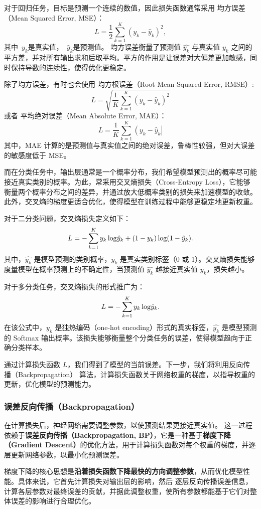 对于回归任务，目标是预测一个连续的数值，因此损失函数通常采用 均方误差（Mean Squared Error, MSE）：
$$ L = \frac{1}{2} \sum_{k=1}^K \left( y_k-\hat y_k \right)^2, $$
其中~$y_k$是真实值，~$\hat y_k$是预测值。 均方误差衡量了预测值 $\hat{y_k}$ 与真实值 $y_k$ 之间的平方差，并对所有输出求和后取平均。平方的作用是让误差对大偏差更加敏感，同时保持导数的连续性，使得优化更稳定。

除了均方误差，有时也会使用 均方根误差（Root Mean Squared Error, RMSE）:
$$
L= \sqrt{\frac{1}{K} \sum_{k=1}^K \left( y_k-\hat y_k \right)^2}
$$
或者 平均绝对误差（Mean Absolute Error, MAE）：
$$
L=\frac{1}{K}  \sum_{k=1}^K \left( y_k-\hat y_k \right|
$$
其中，MAE 计算的是预测值与真实值之间的绝对误差，鲁棒性较强，但对大误差的敏感度低于 MSE。

而在分类任务中，输出层通常是一个概率分布，我们希望模型预测出的概率尽可能接近真实类别的概率。为此，常采用交叉熵损失（Cross-Entropy Loss），它能够衡量两个概率分布之间的差异，并通过放大低概率类别的损失来加速模型的收敛。此外，交叉熵的梯度更适合优化，使得模型在训练过程中能够更稳定地更新权重。

对于二分类问题，交叉熵损失定义如下：
$$
L= -\sum_{k=1}^K y_k\, {\rm log } \hat y_k + (1-y_k) \, {\rm log } (1-\hat y_k).
$$
其中，$\hat{y_k}$ 是模型预测的类别概率，$y_k$ 是真实类别标签（0 或 1）。交叉熵损失能够度量模型在概率预测上的不确定性，当预测值 $\hat{y_k}$ 越接近真实值 $y_k$，损失越小。

对于多分类任务，交叉熵损失的形式推广为：
$$
L= -\sum_{k=1}^K y_k\, {\rm log } \hat y_k.
$$
在该公式中，$y_k$ 是独热编码（one-hot encoding）形式的真实标签，$\hat{y_k}$ 是模型预测的 Softmax 输出概率。该损失能够衡量整个分类任务的误差，使得模型趋向于正确分类样本。

通过计算损失函数 $L$，我们得到了模型的当前误差。下一步，我们将利用反向传播（Backpropagation） 算法，计算损失函数关于网络权重的梯度，以指导权重的更新，优化模型的预测能力。

\subsubsection*{ 误差反向传播（Backpropagation）} 
在计算损失后，神经网络需要调整参数，以使预测结果更接近真实值。
这一过程依赖于{\bf 误差反向传播（Backpropagation, BP）}，它是一种基于{\bf 梯度下降（Gradient Descent）}的优化方法，用于计算损失函数对每个权重的梯度，并逐层更新网络参数，以最小化预测误差。

梯度下降的核心思想是{\bf 沿着损失函数下降最快的方向调整参数}，从而优化模型性能。具体来说，它首先计算损失对输出层的影响，然后 逐层反向传播误差信息，计算各层参数对最终误差的贡献，并据此调整权重，使所有参数都能基于它们对整体误差的影响进行合理优化。

